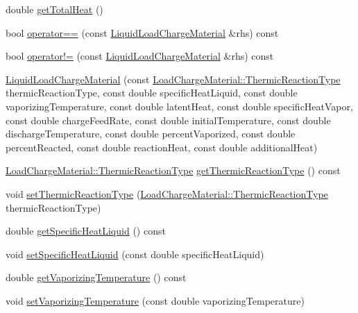 \begin{DoxyCompactItemize}
double \hyperlink{class_liquid_load_charge_material_a51a9826325e2c34cd073b8766331d476}{get\+Total\+Heat} ()
\item 
bool \hyperlink{class_liquid_load_charge_material_ad2090d1628f26e46339e9e164b47d3a2}{operator==} (const \hyperlink{class_liquid_load_charge_material}{Liquid\+Load\+Charge\+Material} \&rhs) const
\item 
bool \hyperlink{class_liquid_load_charge_material_aa6ad825ee8ab1c7816ce3bf10260c0bb}{operator!=} (const \hyperlink{class_liquid_load_charge_material}{Liquid\+Load\+Charge\+Material} \&rhs) const
\item 
\hyperlink{class_liquid_load_charge_material_ab6b2ef342701227c60dc380f5a576085}{Liquid\+Load\+Charge\+Material} (const \hyperlink{namespace_load_charge_material_a51d4263e865a5d86236622dd3fe23fd1}{Load\+Charge\+Material\+::\+Thermic\+Reaction\+Type} thermic\+Reaction\+Type, const double specific\+Heat\+Liquid, const double vaporizing\+Temperature, const double latent\+Heat, const double specific\+Heat\+Vapor, const double charge\+Feed\+Rate, const double initial\+Temperature, const double discharge\+Temperature, const double percent\+Vaporized, const double percent\+Reacted, const double reaction\+Heat, const double additional\+Heat)
\item 
\hyperlink{namespace_load_charge_material_a51d4263e865a5d86236622dd3fe23fd1}{Load\+Charge\+Material\+::\+Thermic\+Reaction\+Type} \hyperlink{class_liquid_load_charge_material_a181337f5e5cf6a47b82dd56897b49c29}{get\+Thermic\+Reaction\+Type} () const
\item 
void \hyperlink{class_liquid_load_charge_material_a39c258d0bfdcfa352590d411a8c4e882}{set\+Thermic\+Reaction\+Type} (\hyperlink{namespace_load_charge_material_a51d4263e865a5d86236622dd3fe23fd1}{Load\+Charge\+Material\+::\+Thermic\+Reaction\+Type} thermic\+Reaction\+Type)
\item 
double \hyperlink{class_liquid_load_charge_material_aa698f1f73dff91951139a4a50582963d}{get\+Specific\+Heat\+Liquid} () const
\item 
void \hyperlink{class_liquid_load_charge_material_a2187c4c6ba394c05ab42e769bf175683}{set\+Specific\+Heat\+Liquid} (const double specific\+Heat\+Liquid)
\item 
double \hyperlink{class_liquid_load_charge_material_a07004e345fb4ff287d435d0c84027973}{get\+Vaporizing\+Temperature} () const
\item 
void \hyperlink{class_liquid_load_charge_material_a50938e3270de5d3c59b872f290a761cc}{set\+Vaporizing\+Temperature} (const double vaporizing\+Temperature)

\end{DoxyCompactItemize}
